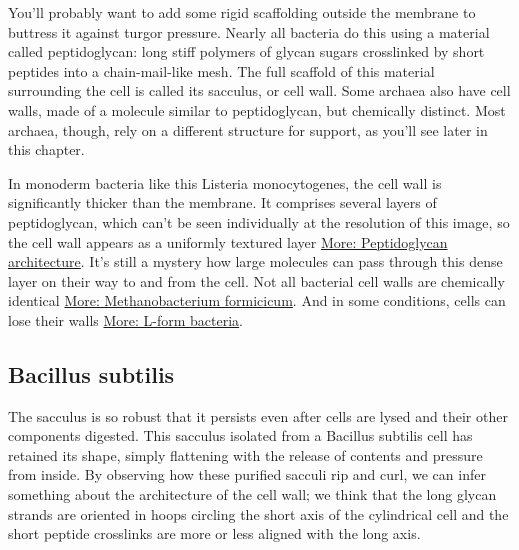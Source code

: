 \documentclass[]{tufte-book}
\begin{document}
You'll probably want to add some rigid scaffolding outside the membrane to buttress it against turgor pressure. Nearly all bacteria do this using a material called peptidoglycan: long stiff polymers of glycan sugars crosslinked by short peptides into a chain-mail-like mesh. The full scaffold of this material surrounding the cell is called its sacculus, or cell wall. Some archaea also have cell walls, made of a molecule similar to peptidoglycan, but chemically distinct. Most archaea, though, rely on a different structure for support, as you'll see later in this chapter.

In monoderm bacteria like this Listeria monocytogenes, the cell wall is significantly thicker than the membrane. It comprises several layers of peptidoglycan, which can't be seen individually at the resolution of this image, so the cell wall appears as a uniformly textured layer \protect\hyperlink{Peptidoglycan_architecture}{More: Peptidoglycan architecture}. It's still a mystery how large molecules can pass through this dense layer on their way to and from the cell. Not all bacterial cell walls are chemically identical \protect\hyperlink{}{More: Methanobacterium formicicum}. And in some conditions, cells can lose their walls \protect\hyperlink{}{More: L-form bacteria}.

\hypertarget{htmlwidget-ed49851b19a75caba904}{}

\hypertarget{Peptidoglycan_architecture}{%
\subsection{Bacillus subtilis}\label{Peptidoglycan_architecture}}

The sacculus is so robust that it persists even after cells are lysed and their other components digested. This sacculus isolated from a Bacillus subtilis cell has retained its shape, simply flattening with the release of contents and pressure from inside. By observing how these purified sacculi rip and curl, we can infer something about the architecture of the cell wall; we think that the long glycan strands are oriented in hoops circling the short axis of the cylindrical cell and the short peptide crosslinks are more or less aligned with the long axis.

\hypertarget{htmlwidget-f246d6a4269264edc2ac}{}
\end{document}

